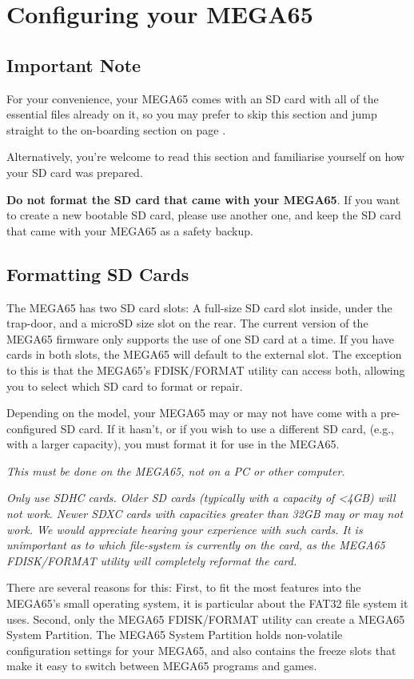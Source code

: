 \chapter{Configuring your MEGA65}
\label{cha:configuring}

\section{Important Note}

For your convenience, your MEGA65 comes with an SD card with all of the essential
files already on it, so you may prefer to skip this section and jump straight to
the on-boarding section on page \pageref{onboarding}.

Alternatively, you're welcome to read this section and familiarise
yourself on how your SD card was prepared.

{\bf Do not format the SD card that came with your MEGA65}.
If you want to create a new bootable SD card, please use another one,
and keep the SD card that came with your MEGA65 as a safety backup.

\section{Formatting SD Cards}
The MEGA65 has two SD card slots: A full-size SD card slot inside, under
the trap-door, and a microSD size slot on the rear.  The current version
of the MEGA65 firmware only supports the use of one SD card at a time.
If you have cards in both slots, the MEGA65 will default to the external slot. The exception to this is that the MEGA65's FDISK/FORMAT
utility can access both, allowing you to select which SD card to format or
repair.

Depending on the model, your MEGA65 may or may not have come with a pre-configured SD card. If it hasn't, or if you wish to use a different SD card,
(e.g., with a larger capacity), you must format it for use in the MEGA65.

{\em This must be done on the MEGA65, not on a PC or other computer.}

{\em Only use SDHC cards. Older SD cards (typically with
  a capacity of <4GB) will not work. Newer SDXC cards with
  capacities greater than 32GB may or may not work. We would
  appreciate hearing your experience with such cards. It is unimportant
  as to which file-system is currently on the card, as the MEGA65
  FDISK/FORMAT utility will completely reformat the card.}

There are several reasons for this: First, to fit the most
features into the MEGA65's small operating system, it is
particular about the FAT32 file system it uses. Second, only the
MEGA65 FDISK/FORMAT utility can create a MEGA65 System Partition. The
MEGA65 System Partition holds non-volatile configuration settings for
your MEGA65, and also contains the freeze slots that make it easy to
switch between MEGA65 programs and games.

